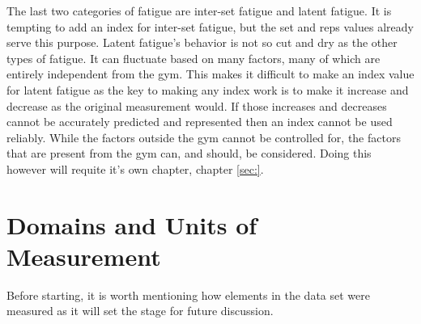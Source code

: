 The last two categories of fatigue are inter-set fatigue and latent fatigue. It is tempting to add an index for inter-set fatigue, but the set and reps values already serve this purpose. Latent fatigue's behavior is not so cut and dry as the other types of fatigue. It can fluctuate based on many factors, many of which are entirely independent from the gym. This makes it difficult to make an index value for latent fatigue as the key to making any index work is to make it increase and decrease as the original measurement would. If those increases and decreases cannot be accurately predicted and represented then an index cannot be used reliably. While the factors outside the gym cannot be controlled for, the factors that are present from the gym can, and should, be considered. Doing this however will requite it's own chapter, chapter \ref{sec:}.


\section{Domains and Units of Measurement}
\label{sec:UnitsOfMeasurement}

Before starting, it is worth mentioning how elements in the data set were measured as it will set the stage for future discussion.

